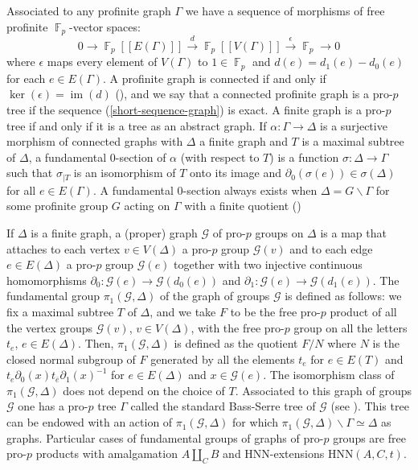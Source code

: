 \documentclass[a4paper]{amsart}
\DeclareMathOperator{\bbf}{\mathbb{F}}
\newcommand{\FFalgebra}[1]{\bbf_p[\![#1]\!]}
\theoremstyle{definition}
\begin{document}
Associated to any profinite graph \(\Gamma\) we have a sequence of morphisms of free profinite \(\bbf_p\)-vector spaces:
\begin{equation}\label{short-sequence-graph}
    0 \to \FFalgebra{E(\Gamma)} \overset{d}{\to} \FFalgebra{V(\Gamma)} \overset{\epsilon}{\to} \bbf_p \to 0
\end{equation}
where \(\epsilon\) maps every element of \(V(\Gamma)\) to \(1 \in \bbf_p\) and \(d(e) = d_1(e) -  d_0(e)\) for each \(e \in E(\Gamma)\). A profinite graph is connected if and only if \(\ker(\epsilon) = \operatorname{im}(d)\) (\cite[Prop. 2.3.2]{ribesProfiniteGraphsGroups2017}), and we say that a connected profinite graph is a pro-\(p\) tree if the sequence (\ref{short-sequence-graph}) is exact. A finite graph is a pro-\(p\) tree if and only if it is a tree as an abstract graph. If \(\alpha\colon \Gamma \to \Delta\) is a surjective morphism of connected graphs with \(\Delta\) a finite graph and \(T\) is a maximal subtree of \(\Delta\), a fundamental \(0\)-section of \(\alpha\) (with respect to \(T\)) is a function \(\sigma\colon \Delta \to \Gamma\) such that \(\sigma_{\mid T}\) is an isomorphism of \(T\) onto its image and \(\partial_0(\sigma(e)) \in \sigma(\Delta)\) for all \(e \in E(\Gamma)\). A fundamental \(0\)-section always exists when \(\Delta = G\backslash \Gamma\) for some profinite group \(G\) acting on \(\Gamma\) with a finite quotient (\cite[Prop. 3.4.5]{ribesProfiniteGraphsGroups2017})

If \(\Delta\) is a finite graph, a (proper) graph \(\mathcal{G}\) of pro-\(p\) groups on \(\Delta\) is a map that attaches to each vertex \(v \in V(\Delta)\) a pro-\(p\) group \(\mathcal{G}(v)\) and to each edge \(e \in E(\Delta)\) a  pro-\(p\) group \(\mathcal{G}(e)\) together with two injective continuous homomorphisms \(\partial_0\colon \mathcal{G}(e) \to \mathcal{G}(d_0(e))\) and \(\partial_1\colon \mathcal{G}(e) \to \mathcal{G}(d_1(e))\). The fundamental group \(\pi_1(\mathcal{G},\Delta)\) of the graph of groups \(\mathcal{G}\) is defined as follows: we fix a maximal subtree \(T\) of \(\Delta\), and we take \(F\) to be the free pro-\(p\) product of all the vertex groups \(\mathcal{G}(v)\), \(v \in V(\Delta)\), with the free pro-\(p\) group on all the letters \(t_e\), \(e \in E(\Delta)\). Then, \(\pi_1(\mathcal{G},\Delta)\) is defined as the quotient \(F/N\) where \(N\) is the closed normal subgroup of \(F\) generated by all the elements \(t_e\) for \(e \in E(T)\) and \(t_e\partial_0(x)t_{\overline{e}}\partial_1(x)^{-1}\) for \(e \in E(\Delta)\) and \(x \in \mathcal{G}(e)\). The isomorphism class of \(\pi_1(\mathcal{G},\Delta)\) does not depend on the choice of \(T\). Associated to this graph of groups \(\mathcal{G}\) one has a pro-\(p\) tree \(\Gamma\) called the standard Bass-Serre tree of \(\mathcal{G}\) (see \cite[Sec. 2.3]{ribesProfiniteGraphsGroups2017}). This tree can be endowed with an action of \(\pi_1(\mathcal{G}, \Delta)\) for which \(\pi_1(\mathcal{G}, \Delta)\backslash \Gamma \simeq \Delta\) as graphs. Particular cases of fundamental groups of graphs of pro-\(p\) groups are free pro-$p$ products with amalgamation \(A \amalg_C B\) and HNN-extensions \(\mathrm{HNN}(A,C,t)\).
\end{document}
